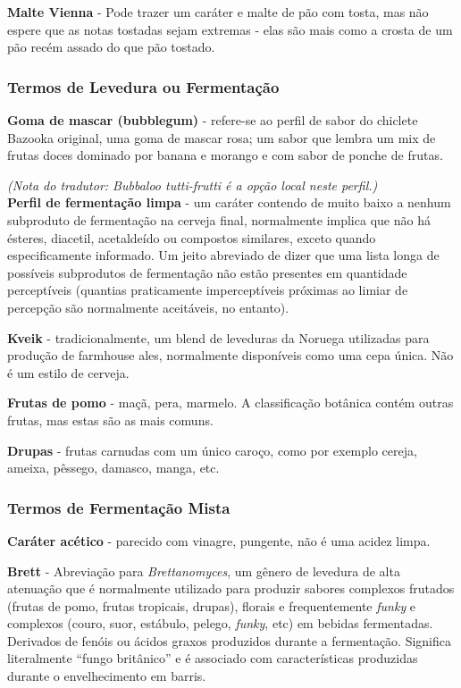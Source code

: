 \textbf{Malte Vienna} - Pode trazer um caráter e malte de pão com tosta, mas não espere que as notas tostadas sejam extremas - elas são mais como a crosta de um pão recém assado do que pão tostado.
\subsubsection*{Termos de Levedura ou Fermentação}
\textbf{Goma de mascar (bubblegum)} - refere-se ao perfil de sabor do chiclete Bazooka original, uma goma de mascar rosa; um sabor que lembra um mix de frutas doces dominado por banana e morango e com sabor de ponche de frutas.

\textit{(Nota do tradutor: Bubbaloo tutti-frutti é a opção local neste perfil.)}\\
\textbf{Perfil de fermentação limpa} - um caráter contendo de muito baixo a nenhum subproduto de fermentação na cerveja final, normalmente implica que não há ésteres, diacetil, acetaldeído ou compostos similares, exceto quando especificamente informado. Um jeito abreviado de dizer que uma lista longa de possíveis subprodutos de fermentação não estão presentes em quantidade perceptíveis (quantias praticamente imperceptíveis próximas ao limiar de percepção são normalmente aceitáveis, no entanto).

\textbf{Kveik} - tradicionalmente, um blend de leveduras da Noruega utilizadas para produção de farmhouse ales, normalmente disponíveis como uma cepa única. Não é um estilo de cerveja.

\textbf{Frutas de pomo} - maçã, pera, marmelo. A classificação botânica contém outras frutas, mas estas são as mais comuns.

\textbf{Drupas} - frutas carnudas com um único caroço, como por exemplo cereja, ameixa, pêssego, damasco, manga, etc.
\subsubsection*{Termos de Fermentação Mista}
\textbf{Caráter acético} - parecido com vinagre, pungente, não é uma acidez limpa.

\textbf{Brett} - Abreviação para \textit{Brettanomyces}, um gênero de levedura de alta atenuação que é normalmente utilizado para produzir sabores complexos frutados (frutas de pomo, frutas tropicais, drupas), florais e frequentemente \textit{funky} e complexos (couro, suor, estábulo, pelego, \textit{funky}, etc) em bebidas fermentadas. Derivados de fenóis ou ácidos graxos produzidos durante a fermentação. Significa literalmente “fungo britânico” e é associado com características produzidas durante o envelhecimento em barris.

